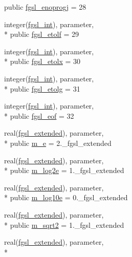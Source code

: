\begin{DoxyCompactItemize}
public \hyperlink{classfgsl_ad9567598ce07cacf43815d0453e649bb}{fgsl\-\_\-enoprogj} = 28
\item 
integer(\hyperlink{classfgsl_a222deda1d7a0c0e845ce4a683318efeb}{fgsl\-\_\-int}), parameter, \\*
public \hyperlink{classfgsl_a9b3ff0443a3c8e9570d06e762b1ca241}{fgsl\-\_\-etolf} = 29
\item 
integer(\hyperlink{classfgsl_a222deda1d7a0c0e845ce4a683318efeb}{fgsl\-\_\-int}), parameter, \\*
public \hyperlink{classfgsl_ad136d96d34c4ac68f155224650a94e4c}{fgsl\-\_\-etolx} = 30
\item 
integer(\hyperlink{classfgsl_a222deda1d7a0c0e845ce4a683318efeb}{fgsl\-\_\-int}), parameter, \\*
public \hyperlink{classfgsl_a12d84e3678cb637e43f1a7a888558110}{fgsl\-\_\-etolg} = 31
\item 
integer(\hyperlink{classfgsl_a222deda1d7a0c0e845ce4a683318efeb}{fgsl\-\_\-int}), parameter, \\*
public \hyperlink{classfgsl_a9641f79a70406a1c9f483f01fdb1ccfa}{fgsl\-\_\-eof} = 32
\item 
real(\hyperlink{classfgsl_a9f38abe97062020e8a507aaa5bc683ab}{fgsl\-\_\-extended}), parameter, \\*
public \hyperlink{classfgsl_abd883826f3a31d832e0746f37ac56cff}{m\-\_\-e} = 2.\-\_\-fgsl\-\_\-extended
\item 
real(\hyperlink{classfgsl_a9f38abe97062020e8a507aaa5bc683ab}{fgsl\-\_\-extended}), parameter, \\*
public \hyperlink{classfgsl_a93d2e5a473874e31cbcf8de12963fd8e}{m\-\_\-log2e} = 1.\-\_\-fgsl\-\_\-extended
\item 
real(\hyperlink{classfgsl_a9f38abe97062020e8a507aaa5bc683ab}{fgsl\-\_\-extended}), parameter, \\*
public \hyperlink{classfgsl_a64dfb3018d641c61312823bf56c85023}{m\-\_\-log10e} = 0.\-\_\-fgsl\-\_\-extended
\item 
real(\hyperlink{classfgsl_a9f38abe97062020e8a507aaa5bc683ab}{fgsl\-\_\-extended}), parameter, \\*
public \hyperlink{classfgsl_a7d0e2199519f7100527499e3c206fc31}{m\-\_\-sqrt2} = 1.\-\_\-fgsl\-\_\-extended
\item 
real(\hyperlink{classfgsl_a9f38abe97062020e8a507aaa5bc683ab}{fgsl\-\_\-extended}), parameter, \\*

\end{DoxyCompactItemize}
